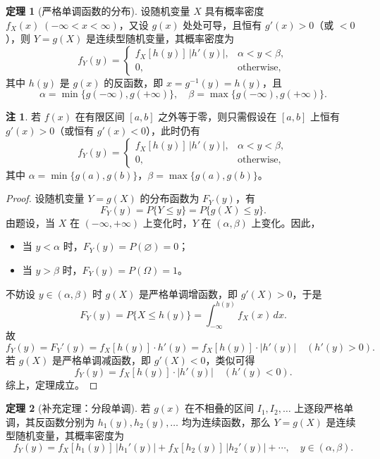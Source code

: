 \documentclass[11pt,a4paper]{report}
\theoremstyle{definition}
\newtheorem{note}{注}[chapter]
\newtheorem{theorem}{定理}[chapter]
\begin{document}
\begin{theorem}[严格单调函数的分布]
设随机变量 $X$ 具有概率密度 $f_X(x)\;(-\infty < x < \infty)$，又设 $g(x)$ 处处可导，且恒有 $g'(x)>0$（或 $<0$），则 $Y=g(X)$ 是连续型随机变量，其概率密度为
\[
\boxed{f_Y(y) = \begin{cases} f_X[h(y)]\,|h'(y)|, & \alpha < y < \beta, \\ 0, & \text{otherwise}, \end{cases}}
\]
其中 $h(y)$ 是 $g(x)$ 的反函数，即 $x=g^{-1}(y)=h(y)$，且
\[
\alpha = \min\{g(-\infty),g(+\infty)\}, \quad \beta = \max\{g(-\infty),g(+\infty)\}.
\]
\end{theorem}

\begin{note}
若 $f(x)$ 在有限区间 $[a,b]$ 之外等于零，则只需假设在 $[a,b]$ 上恒有 $g'(x)>0$（或恒有 $g'(x)<0$），此时仍有
\[
f_Y(y) = \begin{cases} f_X[h(y)]\,|h'(y)|, & \alpha < y < \beta, \\ 0, & \text{otherwise}, \end{cases}
\]
其中 $\alpha=\min\{g(a),g(b)\}$，$\beta=\max\{g(a),g(b)\}$。
\end{note}

\begin{proof}
设随机变量 $Y=g(X)$ 的分布函数为 $F_Y(y)$，有
\[
F_Y(y) = P\{Y \leq y\} = P\{g(X) \leq y\}.
\]
由题设，当 $X$ 在 $(-\infty,+\infty)$ 上变化时，$Y$ 在 $(\alpha,\beta)$ 上变化。因此，
\begin{itemize}[leftmargin=2em]
    \item 当 $y < \alpha$ 时，$F_Y(y)=P(\varnothing)=0$；
    \item 当 $y > \beta$ 时，$F_Y(y)=P(\Omega)=1$。
\end{itemize}
不妨设 $y \in (\alpha,\beta)$ 时 $g(X)$ 是严格单调增函数，即 $g'(X)>0$，于是
\[
F_Y(y) = P\{X \leq h(y)\} = \int_{-\infty}^{h(y)}f_X(x)\,dx.
\]
故
\[
f_Y(y) = F_Y'(y) = f_X[h(y)] \cdot h'(y) = f_X[h(y)] \cdot |h'(y)| \quad (h'(y)>0).
\]
若 $g(X)$ 是严格单调减函数，即 $g'(X)<0$，类似可得
\[
f_Y(y) = f_X[h(y)] \cdot |h'(y)| \quad (h'(y)<0).
\]
综上，定理成立。
\end{proof}

\begin{theorem}[补充定理：分段单调]
若 $g(x)$ 在不相叠的区间 $I_1,I_2,\dots$ 上逐段严格单调，其反函数分别为 $h_1(y),h_2(y),\dots$ 均为连续函数，那么 $Y=g(X)$ 是连续型随机变量，其概率密度为
\[
f_Y(y) = f_X[h_1(y)]\,|h_1'(y)| + f_X[h_2(y)]\,|h_2'(y)| + \cdots, \quad y \in (\alpha,\beta).
\]
\end{theorem}
\end{document}
